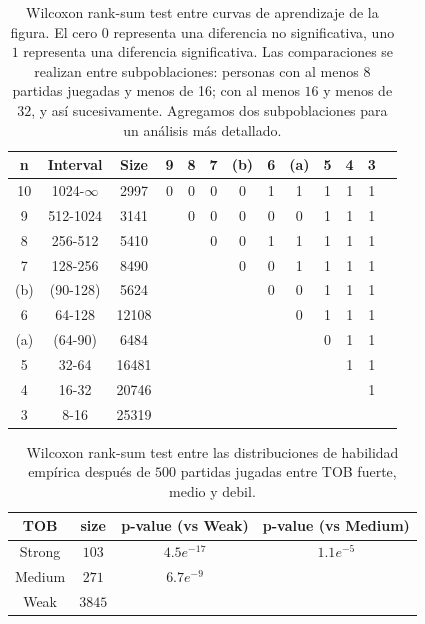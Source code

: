 \documentclass[a4paper,11pt]{book}
\theoremstyle{definition}
\begin{document}
\begin{table}[H]
\centering
\scriptsize
\begin{tabular}{cc|ccccccccccc}

  \hline
n & Interval & Size & 9 & 8 & 7 & (b) & 6 & (a)  & 5 & 4 & 3 \\
  \hline
10 & 1024-$\infty$ & 2997   & 0 & 0 & 0 & 0 & 1 & 1 & 1 & 1 & 1 \\
9 & 512-1024 & 3141   &  & 0 & 0 & 0 & 0 & 0 & 1 & 1 & 1 \\
8 & 256-512 & 5410   &  &  & 0 & 0 & 1 & 1 & 1 & 1 & 1 \\
7 & 128-256 & 8490   &  &  &  & 0 & 0 & 1 & 1 & 1 & 1 \\
(b) & (90-128) & 5624   &  &  &  &  & 0 & 0 & 1 & 1 & 1 \\
6 & 64-128 & 12108   &  &  &  &  &  & 0 & 1 & 1 & 1 \\
(a) & (64-90) & 6484   &  &  &  &  &  &  & 0 & 1 & 1 \\
5 & 32-64 & 16481   &  &  &  &  &  &  &  & 1 & 1 \\
4 & 16-32 & 20746   &  &  &  &  &  &  &  &  & 1 \\
3 & 8-16 & 25319   &  &  &  &  &  &  &  &  &  \\
   \hline

\end{tabular}
\caption{
Wilcoxon rank-sum test entre curvas de aprendizaje de la figura.
El cero $0$ representa una diferencia no significativa, uno $1$ representa una diferencia significativa.
Las comparaciones se realizan entre subpoblaciones: personas con al menos 8 partidas juegadas y menos de 16; con al menos $16$ y menos de $32$, y as\'i sucesivamente.
Agregamos dos subpoblaciones para un an\'alisis m\'as detallado.
}
  \label{learningskill_curve_wilcoxon}
\end{table}



\begin{table}[H]
\centering
\begin{tabular}{cccc}
  \hline
  TOB & size & p-value (vs Weak) & p-value (vs Medium) \\
  \hline
Strong & $103$ & $4.5e^{-17}$ &  $1.1e^{-5}$\\
Medium & $271$ & $6.7e^{-9}$ \\
Weak & $3845$ &  \\
\hline
\end{tabular}
\caption{Wilcoxon rank-sum test entre las distribuciones de habilidad emp\'irica despu\'es de $500$ partidas jugadas entre TOB fuerte, medio y debil.}
\label{learningskill_team_hasta4team_wilcoxon}
\end{table}
\end{document}
